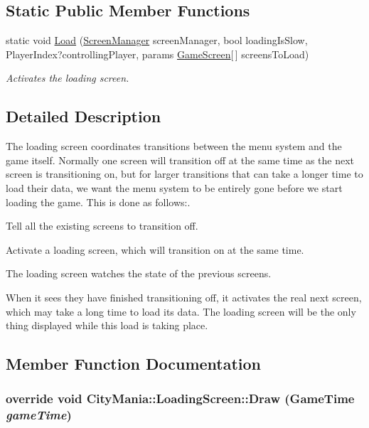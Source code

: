 \subsection*{Static Public Member Functions}
\begin{DoxyCompactItemize}
\item 
static void \hyperlink{classCityMania_1_1LoadingScreen_ae5ce36d16153b9cf72df2d4b199a5e29}{Load} (\hyperlink{classCityMania_1_1ScreenManager}{ScreenManager} screenManager, bool loadingIsSlow, PlayerIndex?controllingPlayer, params \hyperlink{classCityMania_1_1GameScreen}{GameScreen}\mbox{[}$\,$\mbox{]} screensToLoad)
\begin{DoxyCompactList}\small\item\em Activates the loading screen. \item\end{DoxyCompactList}\end{DoxyCompactItemize}


\subsection{Detailed Description}
The loading screen coordinates transitions between the menu system and the game itself. Normally one screen will transition off at the same time as the next screen is transitioning on, but for larger transitions that can take a longer time to load their data, we want the menu system to be entirely gone before we start loading the game. This is done as follows:. 
\begin{DoxyItemize}
\item Tell all the existing screens to transition off.
\item Activate a loading screen, which will transition on at the same time.
\item The loading screen watches the state of the previous screens.
\item When it sees they have finished transitioning off, it activates the real next screen, which may take a long time to load its data. The loading screen will be the only thing displayed while this load is taking place. 
\end{DoxyItemize}

\subsection{Member Function Documentation}
\hypertarget{classCityMania_1_1LoadingScreen_ad5f650a3e0ce04391c97347a738dab2f}{
\subsubsection[{Draw}]{\setlength{\rightskip}{0pt plus 5cm}override void CityMania::LoadingScreen::Draw (GameTime {\em gameTime})}}
\label{classCityMania_1_1LoadingScreen_ad5f650a3e0ce04391c97347a738dab2f}


